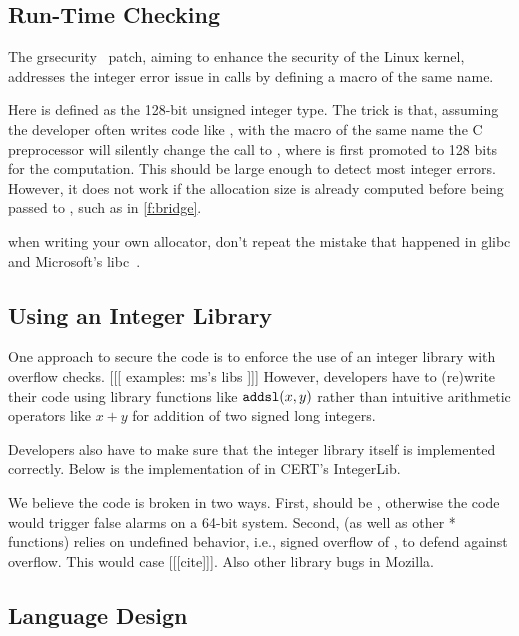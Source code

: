 \subsection{Run-Time Checking}

The grsecurity~\cite{grsecurity} patch, aiming to enhance the
security of the Linux kernel, addresses the integer error issue
in  calls by defining a macro of the same name.
%

%
Here  is defined as the 128-bit unsigned integer
type.  The trick is that, assuming the developer often writes code
like , with the macro of the same name
the C preprocessor will silently change the call to
, where  is first
promoted to 128 bits for the computation.  This should be large
enough to detect most integer errors.  However, it does not work
if the allocation size is already computed before being passed to
, such as in \autoref{f:bridge}.

when writing your own allocator, don't repeat the mistake that
happened in glibc and Microsoft's libc~\cite{rus-cert:calloc}.

\subsection{Using an Integer Library}

One approach to secure the code is to enforce the use of an integer library
with overflow checks. [[[ examples: ms's libs ]]]
However, developers have to (re)write their
code using library functions like $\texttt{addsl}(x, y)$ rather than
intuitive arithmetic operators like $x + y$ for addition of two signed
long integers.

Developers also have to make sure that the integer library itself
is implemented correctly.  Below is the implementation of 
in CERT's IntegerLib.
%

%
We believe the code is broken in two ways. First, 
should be , otherwise the code would
trigger false alarms on a 64-bit system.  Second, 
(as well as other * functions)
relies on undefined behavior, i.e., signed overflow of ,
to defend against overflow.  This would case [[[cite]]].  Also other
library bugs in Mozilla.

\subsection{Language Design}

